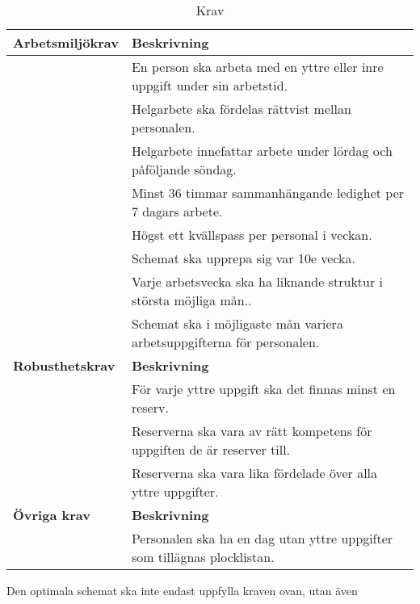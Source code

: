 \begin{table}[H]
\caption{Krav}
\label{int:3}
\begin{tabular}{|l|l|}
\hline
\textbf{Arbetsmiljökrav} & \textbf{Beskrivning} \\ \hline
& En person ska arbeta med en yttre eller inre uppgift under sin arbetstid.
\\ \hline 
 & Helgarbete ska fördelas rättvist mellan personalen. 
\\ \hline 
 & Helgarbete innefattar arbete under lördag och påföljande söndag.
\\ \hline 
 & Minst 36 timmar sammanhängande ledighet per 7 dagars arbete.
\\ \hline 
 & Högst ett kvällspass per personal i veckan.
\\ \hline 
 & Schemat ska upprepa sig var 10e vecka.
\\ \hline 
 & Varje arbetsvecka ska ha liknande struktur i största möjliga mån..
\\ \hline 
 & Schemat ska i möjligaste mån variera arbetsuppgifterna för personalen.
\\ \hline 

\textbf{Robusthetskrav} & \textbf{Beskrivning} \\ \hline
 & För varje yttre uppgift ska det finnas minst en reserv.
\\ \hline 
 & Reserverna ska vara av rätt kompetens för uppgiften de är reserver till.
\\ \hline 
 & Reserverna ska vara lika fördelade över alla yttre uppgifter.
\\ \hline 

\textbf{Övriga krav} & \textbf{Beskrivning} \\ \hline
 & Personalen ska ha en dag utan yttre uppgifter som tillägnas plocklistan.
\\ \hline 
\end{tabular}
\end{table}
\medskip

Den optimala schemat ska inte endast uppfylla kraven ovan, utan även 


